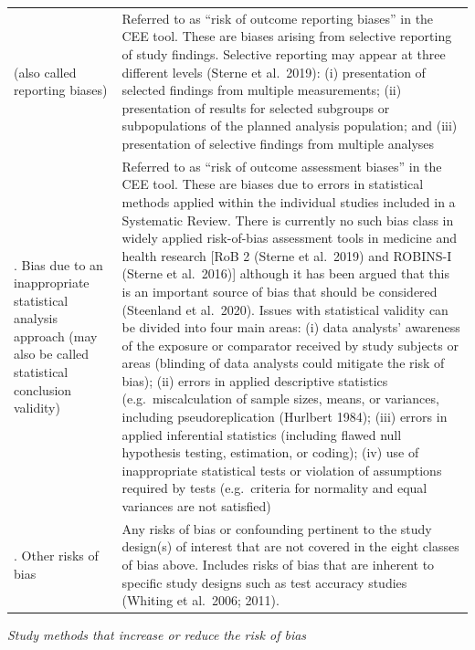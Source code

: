 \documentclass[
  letterpaper,
  DIV=11,
  numbers=noendperiod]{scrreprt}
\begin{document}
{\begin{longtable}[]{@{}
  >{\raggedright\arraybackslash}p{}
  >{\raggedright\arraybackslash}p{}@{}}
\begin{minipage}[t]{\linewidth}
(also called reporting biases)\strut
\end{minipage} & Referred to as ``risk of outcome reporting biases'' in
the CEE tool. These are biases arising from selective reporting of study
findings. Selective reporting may appear at three different levels
(Sterne et al.~2019): (i) presentation of selected findings from
multiple measurements; (ii) presentation of results for selected
subgroups or subpopulations of the planned analysis population; and
(iii) presentation of selective findings from multiple analyses \\
8. Bias due to an inappropriate statistical analysis approach (may also
be called statistical conclusion validity) & Referred to as ``risk of
outcome assessment biases'' in the CEE tool. These are biases due to
errors in statistical methods applied within the individual studies
included in a Systematic Review. There is currently no such bias class
in widely applied risk-of-bias assessment tools in medicine and health
research {[}RoB 2 (Sterne et al.~2019) and ROBINS-I (Sterne et
al.~2016){]} although it has been argued that this is an important
source of bias that should be considered (Steenland et al.~2020). Issues
with statistical validity can be divided into four main areas: (i) data
analysts' awareness of the exposure or comparator received by study
subjects or areas (blinding of data analysts could mitigate the risk of
bias); (ii) errors in applied descriptive statistics
(e.g.~miscalculation of sample sizes, means, or variances, including
pseudoreplication (Hurlbert 1984); (iii) errors in applied inferential
statistics (including flawed null hypothesis testing, estimation, or
coding); (iv) use of inappropriate statistical tests or violation of
assumptions required by tests (e.g.~criteria for normality and equal
variances are not satisfied) \\
9. Other risks of bias & Any risks of bias or confounding pertinent to
the study design(s) of interest that are not covered in the eight
classes of bias above. Includes risks of bias that are inherent to
specific study designs such as test accuracy studies (Whiting et
al.~2006; 2011). \\
\end{longtable}
}

\emph{Study methods that increase or reduce the risk of bias}
\end{document}
